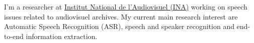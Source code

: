
I'm a researcher at \href{https://www.ina.fr/institut-national-audiovisuel/research}{Institut National de l'Audiovisuel (INA)} working on speech issues related to audiovisuel archives. My current main research interest are Automatic Speech Recognition (ASR), speech and speaker recognition and end-to-end information extraction.

